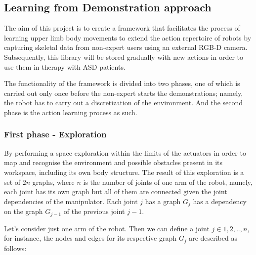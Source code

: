\documentclass[thesis]{mas_proposal}
\begin{document}
\subsection{Learning from Demonstration approach}

    The aim of this project is to create a framework that facilitates the process of learning upper limb body movements to extend the action repertoire of robots by capturing skeletal data from non-expert users using an external RGB-D camera. Subsequently, this library will be stored gradually with new actions in order to use them in therapy with ASD patients.
    
    The functionality of the framework is divided into two phases, one of which is carried out only once before the non-expert starts the demonstrations; namely, the robot has to carry out a discretization of the environment. And the second phase is the action learning process as such.
    
    \subsubsection{First phase - Exploration}
    
    By performing a space exploration within the limits of the actuators in order to map and recognise the environment and possible obstacles present in its workspace, including its own body structure. The result of this exploration is a set of $2n$ graphs, where $n$ is the number of joints of one arm of the robot, namely, each joint has its own graph but all of them are connected given the joint dependencies of the manipulator. Each joint $j$ has a graph $G_j$ has a dependency on the graph $G_{j-1}$ of the previous joint $j-1$. 
    
    Let's consider just one arm of the robot. Then we can define a joint $j \in {1,2,..,n}$, for instance, the nodes and edges for its respective graph $G_j$ are described as follows:
    
\end{document}

